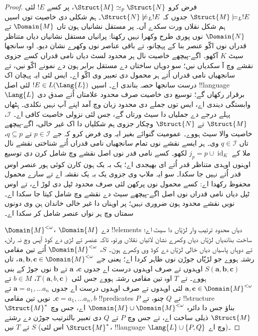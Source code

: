 \documentclass[../../../include/open-logic-section]{subfiles}
\begin{document}
\begin{proof}
فرض کرو $\Struct{M} \simeq_p \Struct{N}$، پر کسے $!E$ لئی
$\Struct{M} \models_L !E$ جدوں کہ
$\Struct{N} \not\models_L !E$۔ ہم شکلی دی خاصیت توں اسیں
ہم شکل نقلاں ورت سکدے آں۔ پر مستقل نشانیاں ہون تاں
$\Domain{M}$ تے $\Domain{N}$ نوں پوری طرح وکھرا نہیں رکھنا:
پرانیاں مستقل نشانیاں دیاں متناظر قدراں نوں اکّو عنصر بنا کے پہچانو،
تے باقی عناصر نوں وکھرے نشان دیو۔ اوہ سانجھا سیٹ $K$ آکھو۔
اگے-پیچھے خاصیت نال ہر محدود لسٹ دیاں نامی قدراں کسے جزوی نقشے
وچ آ سکدیاں نیں؛ سو دوہاں ساختاں دے مستقل برابر ہون دے نمونے
اکّو نیں، تے سانجھیاں نامی قدراں اُتے ہر محمول دی تعبیر وی اکّو اے۔
ایس لئی ایہ پہچان اک درست سانجھا حصہ بناندی اے۔
اسیں
$!E \in
L(\Lang{L})$ لئی اصل !!{language}~$\Lang{L}$ برقرار رکھاں گے؛
توسیع دی خاصیت صرف محدود علامتاں اُتے صدق دی وابستگی دیندی اے،
ایس توں جملے دی محدود زبان وچ آمد اپنے آپ نہیں نکلدی۔ ہِٹھاں
پہلے درجے دے جملیاں دا سیٹ ورتاں گے، جس لئی نزولی خاصیت کافی اے۔
$\mathcal{I}$، $\Struct{M}$ تے $\Struct{N}$ وچکار جزوی
ہم شکلیاں دا اک غیر خالی، اگے-پیچھے خاصیت والا سیٹ ہووے۔
عمومیت گنوائے بغیر ایہ وی فرض
کرو کہ جے $p
\in \mathcal{I}$ تے $q \subseteq p$، تاں
$q \in \mathcal{I}$ وی۔ ہر ایسے نقشے نوں تمام سانجھیاں نامی
قدراں اُتے شناختی نقشے نال ملا کے $j_p=p\cup\operatorname{id}_K$
لکھو۔ کسے نامی قدر نوں اصل نقشے وچ شامل کرن دی توسیع اوہنوں
اوہدی متناظر قدر اُتے ای بھیجدی اے؛ یک بہ یک ہون کارن کوئی ہور
عنصر اوس قدر اُتے نہیں جا سکدا۔ سو ایہ ملاپ وی جزوی یک بہ یک
نقشہ اے تے سارے محمول محفوظ رکھدا اے:
کسے محمول نوں پرکھن لئی صرف محدود ٹپل دی لوڑ اے، تے اوس ٹپل
دیاں نامی قدراں نوں اصل اگے-پیچھے سیٹ دے نقشے وچ شامل کیتا جا سکدا اے۔
نویں نقشے محدود ہون ضروری نہیں؛ پر اوہناں دا غیر خالی خاندان ہن وی
دونوں سمتاں وچ ہر نواں عنصر شامل کر سکدا اے۔

$\Domain{M}^{<\omega}$، $\Domain{M}$ دے !!{element}s دیاں
محدود ترتیب وار لڑیّاں دا سیٹ اے؛ ساخت بناندیاں لڑیّاں دیاں
وکھرے نشان لائیاں نقلاں ورتو، تاکہ عنصر تے لڑی دے کوڈ آپس وچ
نہ رلن، تے دوہاں پاسیاں دیاں خالی لڑیّاں دے کوڈ وی وکھرے ہون۔ $S$،
$\Domain{M}^{<\omega}$ اُتے تین مقامی رشتہ ہووے جو لڑیّاں
جوڑن نوں ظاہر کردا اے؛ یعنی جے $\mathbf{a}, \mathbf{b},
\mathbf{c} \in \Domain{M}^{<\omega}$، تاں
$S(\mathbf{a}, \mathbf{b},
\mathbf{c})$ اوہدوں تے صرف اوہدوں درست اے جدوں
$\mathbf{c}$، $\mathbf{a}$ تے $\mathbf{b}$ نوں جوڑ
کے بنی ہووے۔ تے $T$ اوہ تین مقامی رشتہ ہووے جس لئی
$T(\mathbf{a}, b, \mathbf{c})$، $b \in M$ تے
$\mathbf{a}, \mathbf{c} \in \Domain{M}^{<\omega}$ لئی
اوہدوں تے صرف اوہدوں درست اے جدوں $\mathbf{a} =
a_1, \dots a_n$ تے $\mathbf{c} = a_1, \dots a_n, b$۔
نویں تین مقامی !!{predicate}s $P$ تے $Q$ چنو، تے
!!{structure} $\Struct{M}^*$ بناؤ جس دا دائرہ
$\Domain{M} \cup \Domain{M}^{<\omega}$ اے،
جس وچ $\Struct{M}$ ذیلی ساخت اے، تے جس وچ $P$ تے $Q$
دی تعبیر بالترتیب جوڑن دے رشتے $S$ تے $T$ نیں
(اس لئی $\Struct{M}^*$،
!!{language} $\Lang{L} \cup \{ P, Q\}$ وچ اے)۔


\end{proof}
\end{document}

